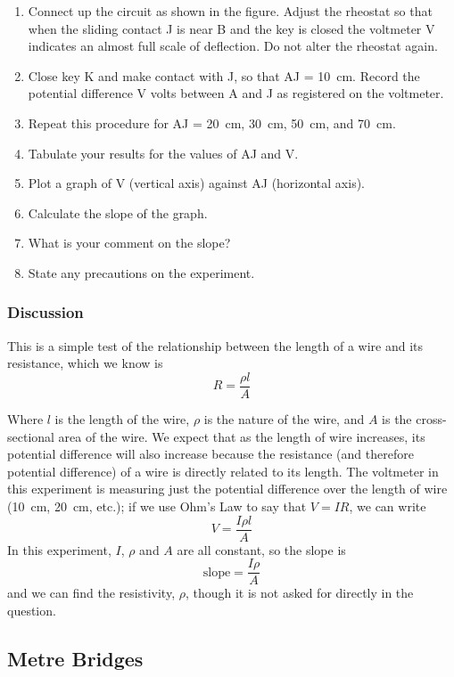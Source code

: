 
\begin{enumerate}
\item{Connect up the circuit as shown in the figure. Adjust the rheostat so that when the sliding
contact J is near B and the key is closed the voltmeter V indicates an almost full scale
of deflection. Do not alter the rheostat again.}
\item{Close key K and make contact with J, so that AJ = 10~cm. Record the potential
difference V volts between A and J as registered on the voltmeter.}
\item{Repeat this procedure for AJ = 20~cm, 30~cm, 50~cm, and 70~cm.}
\item{Tabulate your results for the values of AJ and V.}
\item{Plot a graph of V (vertical axis) against AJ (horizontal axis).}
\item{Calculate the slope of the graph.}
\item{What is your comment on the slope?}
\item{State any precautions on the experiment.}
\end{enumerate}

\subsubsection{Discussion}

This is a simple test of the relationship between the length of a wire and its
resistance, which we know is $$R=\frac{\rho l}{A} $$

Where $l$ is the length of the wire, $\rho$ is the nature of the wire, and $A$ is the cross-sectional
area of the wire. We expect that as the length of wire increases, its potential difference
will also increase because the resistance (and therefore potential difference) of a wire is
directly related to its length. The voltmeter in this experiment is measuring just the
potential difference over the length of wire (10~cm, 20~cm, etc.); if we use Ohm’s Law to say that $V = IR$, we can write
$$ V = \frac{I \rho l}{A} $$
In this experiment, $I$, $\rho$ and $A$ are all constant, so the slope is
$$\mathrm{slope} = \frac{I \rho}{A} $$
and we can find the resistivity, $\rho$, though it is not asked for directly in the question.

\subsection{Metre Bridges}

